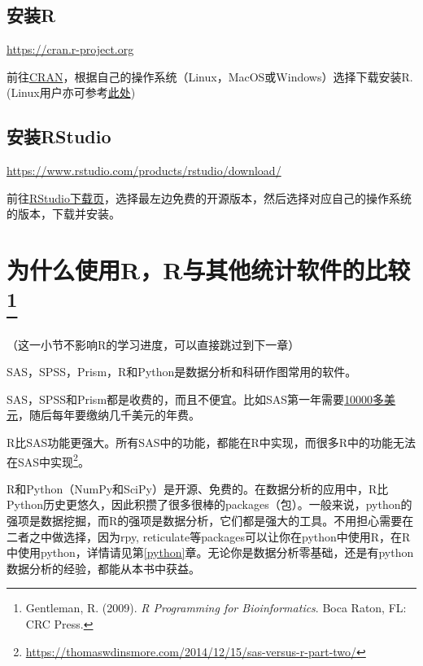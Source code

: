 \documentclass[]{book}
\let\rmarkdownfootnote\footnote%
\def\footnote{\protect\rmarkdownfootnote}
\begin{document}
\hypertarget{r}{%
\subsection{安装R}\label{r}}

\url{https://cran.r-project.org}

前往\href{https://cran.r-project.org}{CRAN}，根据自己的操作系统（Linux，MacOS或Windows）选择下载安装R. (Linux用户亦可参考\href{https://blog.zenggyu.com/en/post/2018-01-29/installing-r-r-packages-e-g-tidyverse-and-rstudio-on-ubuntu-linux/}{此处})

\hypertarget{rstudio}{%
\subsection{安装RStudio}\label{rstudio}}

\url{https://www.rstudio.com/products/rstudio/download/}

前往\href{https://www.rstudio.com/products/rstudio/download/}{RStudio下载页}，选择最左边免费的开源版本，然后选择对应自己的操作系统的版本，下载并安装。

\hypertarget{youshi}{%
\section[为什么使用R，R与其他统计软件的比较]{\texorpdfstring{为什么使用R，R与其他统计软件的比较\footnote{Gentleman, R. (2009). \emph{R Programming for Bioinformatics}. Boca Raton, FL: CRC Press.}}{为什么使用R，R与其他统计软件的比较}}\label{youshi}}

（这一小节不影响R的学习进度，可以直接跳过到下一章）

SAS，SPSS，Prism，R和Python是数据分析和科研作图常用的软件。

SAS，SPSS和Prism都是收费的，而且不便宜。比如SAS第一年需要\href{http://www.sas.com/store/products-solutions/cSoftware-p1.html}{10000多美元}，随后每年要缴纳几千美元的年费。

R比SAS功能更强大。所有SAS中的功能，都能在R中实现，而很多R中的功能无法在SAS中实现\footnote{\url{https://thomaswdinsmore.com/2014/12/15/sas-versus-r-part-two/}}。

R和Python（NumPy和SciPy）是开源、免费的。在数据分析的应用中，R比Python历史更悠久，因此积攒了很多很棒的packages（包）。一般来说，python的强项是数据挖掘，而R的强项是数据分析，它们都是强大的工具。不用担心需要在二者之中做选择，因为rpy, reticulate等packages可以让你在python中使用R，在R中使用python，详情请见第\ref{python}章。无论你是数据分析零基础，还是有python数据分析的经验，都能从本书中获益。
\end{document}
